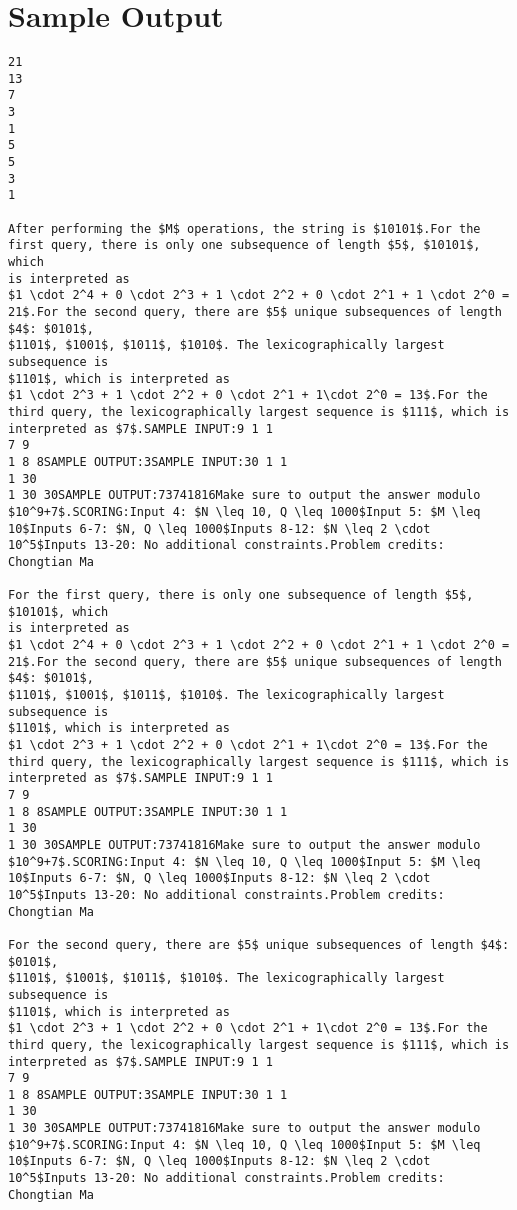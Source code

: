 \documentclass[12pt]{article}
\begin{document}
\section*{Sample Output}
\begin{verbatim}
21
13
7
3
1
5
5
3
1

After performing the $M$ operations, the string is $10101$.For the first query, there is only one subsequence of length $5$, $10101$, which
is interpreted as
$1 \cdot 2^4 + 0 \cdot 2^3 + 1 \cdot 2^2 + 0 \cdot 2^1 + 1 \cdot 2^0 = 21$.For the second query, there are $5$ unique subsequences of length $4$: $0101$,
$1101$, $1001$, $1011$, $1010$. The lexicographically largest subsequence is
$1101$, which is interpreted as
$1 \cdot 2^3 + 1 \cdot 2^2 + 0 \cdot 2^1 + 1\cdot 2^0 = 13$.For the third query, the lexicographically largest sequence is $111$, which is
interpreted as $7$.SAMPLE INPUT:9 1 1
7 9
1 8 8SAMPLE OUTPUT:3SAMPLE INPUT:30 1 1
1 30
1 30 30SAMPLE OUTPUT:73741816Make sure to output the answer modulo $10^9+7$.SCORING:Input 4: $N \leq 10, Q \leq 1000$Input 5: $M \leq 10$Inputs 6-7: $N, Q \leq 1000$Inputs 8-12: $N \leq 2 \cdot 10^5$Inputs 13-20: No additional constraints.Problem credits: Chongtian Ma

For the first query, there is only one subsequence of length $5$, $10101$, which
is interpreted as
$1 \cdot 2^4 + 0 \cdot 2^3 + 1 \cdot 2^2 + 0 \cdot 2^1 + 1 \cdot 2^0 = 21$.For the second query, there are $5$ unique subsequences of length $4$: $0101$,
$1101$, $1001$, $1011$, $1010$. The lexicographically largest subsequence is
$1101$, which is interpreted as
$1 \cdot 2^3 + 1 \cdot 2^2 + 0 \cdot 2^1 + 1\cdot 2^0 = 13$.For the third query, the lexicographically largest sequence is $111$, which is
interpreted as $7$.SAMPLE INPUT:9 1 1
7 9
1 8 8SAMPLE OUTPUT:3SAMPLE INPUT:30 1 1
1 30
1 30 30SAMPLE OUTPUT:73741816Make sure to output the answer modulo $10^9+7$.SCORING:Input 4: $N \leq 10, Q \leq 1000$Input 5: $M \leq 10$Inputs 6-7: $N, Q \leq 1000$Inputs 8-12: $N \leq 2 \cdot 10^5$Inputs 13-20: No additional constraints.Problem credits: Chongtian Ma

For the second query, there are $5$ unique subsequences of length $4$: $0101$,
$1101$, $1001$, $1011$, $1010$. The lexicographically largest subsequence is
$1101$, which is interpreted as
$1 \cdot 2^3 + 1 \cdot 2^2 + 0 \cdot 2^1 + 1\cdot 2^0 = 13$.For the third query, the lexicographically largest sequence is $111$, which is
interpreted as $7$.SAMPLE INPUT:9 1 1
7 9
1 8 8SAMPLE OUTPUT:3SAMPLE INPUT:30 1 1
1 30
1 30 30SAMPLE OUTPUT:73741816Make sure to output the answer modulo $10^9+7$.SCORING:Input 4: $N \leq 10, Q \leq 1000$Input 5: $M \leq 10$Inputs 6-7: $N, Q \leq 1000$Inputs 8-12: $N \leq 2 \cdot 10^5$Inputs 13-20: No additional constraints.Problem credits: Chongtian Ma


\end{verbatim}
\end{document}
